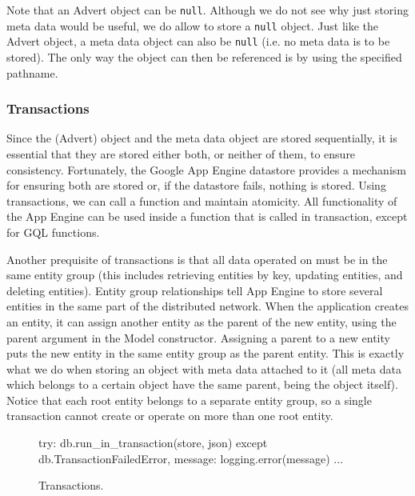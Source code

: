 Note that an Advert object can be \texttt{null}. Although we do not see why just
storing meta data would be useful, we do allow to store a \texttt{null} object.
Just like the Advert object, a meta data object can also be \texttt{null} (i.e.
no meta data is to be stored). The only way the object can then be referenced is
by using the specified pathname.

\subsubsection{Transactions}
\label{serverimpl-transactions}
Since the (Advert) object and the meta data object are stored sequentially, it
is essential that they are stored either both, or neither of them, to ensure
consistency. Fortunately, the Google App Engine datastore provides a mechanism
for ensuring both are stored or, if the datastore fails, nothing is stored.
Using transactions, we can call a function and maintain atomicity. All
functionality of the App Engine can be used inside a function that is called in
transaction, except for GQL functions.

Another prequisite of transactions is that all data operated on must be in the
same entity group (this includes retrieving entities by key, updating entities, and
deleting entities). Entity group relationships tell App Engine to store several
entities in the same part of the distributed network. When the application
creates an entity, it can assign another entity as the parent of the new entity,
using the parent argument in the Model constructor. Assigning a parent to a new
entity puts the new entity in the same entity group as the parent entity. This is
exactly what we do when storing an object with meta data attached to it (all
meta data which belongs to a certain object have the same parent, being the
object itself). Notice that each root entity belongs to a separate entity group,
so a single transaction cannot create or operate on more than one root entity. 

\begin{figure*}[ht] %
\begin{center}
\begin{code}
try:
  db.run_in_transaction(store, json) 
except db.TransactionFailedError, message:
  logging.error(message)
  ...
\end{code}
\caption{Transactions.\label{serverimpl-trans-func}}
\end{center}
\end{figure*}

